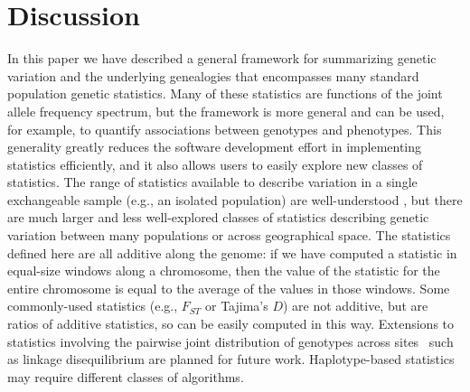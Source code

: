 \documentclass{article}
\newcommand{\tiw}{w_\text{total}} %
\begin{document}
\section*{Discussion}

In this paper we have described a general framework for summarizing genetic variation
and the underlying genealogies
that encompasses many standard population genetic statistics.
Many of these statistics are functions of the joint allele frequency spectrum,
but the framework is more general and can be used,
for example, to quantify associations between genotypes and phenotypes.
This generality greatly reduces the software development effort in
implementing statistics efficiently,
and it also allows users to easily explore new classes of statistics.
The range of statistics available to describe variation in a single exchangeable sample
(e.g., an isolated population) are well-understood
\citep{achaz2009frequency,ferretti2017decomposing},
but there are much larger and less well-explored classes of statistics
describing genetic variation between many populations
or across geographical space.
The statistics defined here are all additive along the genome:
if we have computed a statistic in equal-size windows along a chromosome,
then the value of the statistic for the entire chromosome is equal to
the average of the values in those windows.
Some commonly-used statistics (e.g., $F_{ST}$ or Tajima's $D$)
are not additive, but are ratios of additive statistics, so can be easily computed in this way.
Extensions to statistics involving the pairwise joint distribution of genotypes across
sites~\citep{hudson2001twolocus} such as linkage disequilibrium are planned for future work.
Haplotype-based statistics may require different classes of algorithms.

\end{document}
